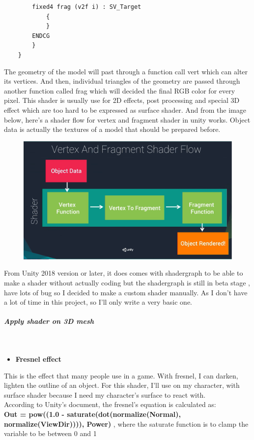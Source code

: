 \documentclass[a4paper, 13pt]{extarticle}
\begin{document}
{\begin{itemize}
\begin{lstlisting}
 		fixed4 frag (v2f i) : SV_Target
 			{
 			}
 		ENDCG
 		}
 	}
 \end{lstlisting}
 \end{itemize}
The geometry of the model will past through a function call vert which can alter its vertices. And then, individual triangles of the geometry are passed through another function called frag which will decided the final RGB color for every pixel. This shader is usually use for 2D effects, post processing and special 3D effect which are too hard to be expressed as surface shader. And from the image below, here's a shader flow for vertex and fragment shader in unity works. Object data is actually the textures of a model that should be prepared before.
   \begin{figure}[h]
	\begin{minipage}{1\textwidth}
		\centering
		\includegraphics[width=0.55\linewidth]{intructions/vertex_fragment_flow.png}
		\label{fig:test29}
		\centering
	\end{minipage}
\end{figure}
From Unity 2018 version or later, it does comes with shadergraph to be able to make a shader without actually coding but the shadergraph is still in beta stage , have lots of bug so I decided to make a custom shader manually. As I don't have a lot of time in this project, so I'll only write a very basic one. 
 \subparagraph{Apply shader on 3D mesh} ~\\[-0.8cm]
 \begin{itemize}
 	\item \bfseries Fresnel effect
 \end{itemize}
   This is the effect that many people use in a game. With fresnel, I can darken, lighten the outline of an object. For this shader, I'll use on my character, with surface shader because I need my character's surface to react with. \\[0.01cm] According to Unity's document, the fresnel's equation is calculated as: \\ {\bfseries Out = pow((1.0 - saturate(dot(normalize(Normal), normalize(ViewDir)))), Power) }, where the saturate function is to clamp the variable to be between 0 and 1 \\
}
\end{document}
